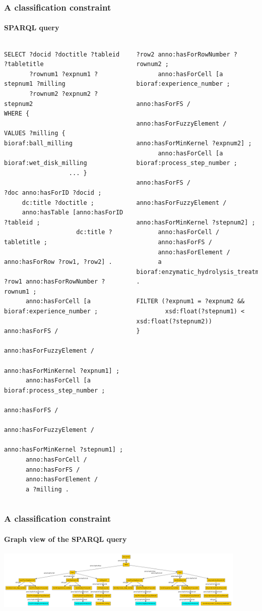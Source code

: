 \documentclass{beamer}
\begin{document}
\begin{frame}[fragile]
  \frametitle{A classification constraint}
  \framesubtitle{SPARQL query}

  \begin{columns}[t]
    \begin{Verbatim}[fontsize=\tiny]
SELECT ?docid ?doctitle ?tableid ?tabletitle
       ?rownum1 ?expnum1 ?stepnum1 ?milling
       ?rownum2 ?expnum2 ?stepnum2
WHERE {

VALUES ?milling { bioraf:ball_milling
                  bioraf:wet_disk_milling
                  ... }

?doc anno:hasForID ?docid ;
     dc:title ?doctitle ;
     anno:hasTable [anno:hasForID ?tableid ;
                    dc:title ?tabletitle ;
                    anno:hasForRow ?row1, ?row2] .

?row1 anno:hasForRowNumber ?rownum1 ;
      anno:hasForCell [a bioraf:experience_number ;
                       anno:hasForFS /
                       anno:hasForFuzzyElement /
                       anno:hasForMinKernel ?expnum1] ;
      anno:hasForCell [a bioraf:process_step_number ;
                       anno:hasForFS /
                       anno:hasForFuzzyElement /
                       anno:hasForMinKernel ?stepnum1] ;
      anno:hasForCell /
      anno:hasForFS /
      anno:hasForElement /
      a ?milling .
    \end{Verbatim}

    \begin{Verbatim}[fontsize=\tiny]
?row2 anno:hasForRowNumber ?rownum2 ;
      anno:hasForCell [a bioraf:experience_number ;
                       anno:hasForFS /
                       anno:hasForFuzzyElement /
                       anno:hasForMinKernel ?expnum2] ;
      anno:hasForCell [a bioraf:process_step_number ;
                       anno:hasForFS /
                       anno:hasForFuzzyElement /
                       anno:hasForMinKernel ?stepnum2] ;
      anno:hasForCell /
      anno:hasForFS /
      anno:hasForElement /
      a bioraf:enzymatic_hydrolysis_treatment .

FILTER (?expnum1 = ?expnum2 &&
        xsd:float(?stepnum1) < xsd:float(?stepnum2))
}
    \end{Verbatim}
  \end{columns}
\end{frame}

\begin{frame}
  \frametitle{A classification constraint}
  \framesubtitle{Graph view of the SPARQL query}

  \begin{center}
    \includegraphics[width=12cm]{classification-constraint.png}
  \end{center}
\end{frame}
\end{document}
